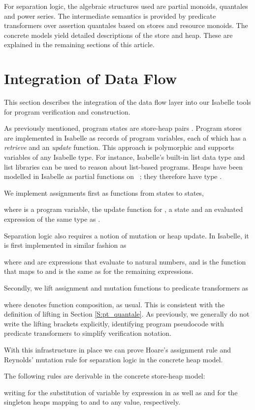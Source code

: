 \documentclass[twoside,runningheads,envcountsame,envcountsect,oribibl,orivec]{llncs}
\begin{document}
For separation logic, the algebraic structures used are partial
monoids, quantales and power series. The intermediate semantics is
provided by predicate transformers over assertion quantales based on
stores and resource monoids. The concrete models yield detailed
descriptions of the store and heap. These are explained in the
remaining sections of this article.






\section{Integration of Data Flow}\label{S:data_flow}

This section describes the integration of the data flow layer into our
Isabelle tools for program verification and construction.

As previously mentioned, program states are store-heap pairs .
Program stores are implemented in Isabelle as records of program
variables, each of which has a \emph{retrieve} and an \emph{update}
function.  This approach is polymorphic and supports variables of any
Isabelle type.  For instance, Isabelle's built-in list data type and
list libraries can be used to reason about list-based programs.  Heaps
have been modelled in Isabelle as partial functions on
~\cite{MehtaN05,Weber04}; they therefore have type
.

We implement assignments first as functions from states to states,

where  is a program variable,  the update function for
,   a state and  an evaluated expression of the same type as .

Separation logic also requires a notion of mutation or heap update.
In Isabelle, it is first implemented in similar fashion as

where  and  are expressions that evaluate to natural numbers,
and  is the function that maps  to  and is the
same as  for the remaining expressions.

Secondly, we lift assignment and mutation functions to
predicate transformers as

where  denotes function composition, as usual. This is
consistent with the definition of lifting in Section
\ref{S:pt_quantale}. As previously, we generally do not write the
lifting brackets explicitly, identifying program pseudocode with
predicate transformers to simplify verification notation.

With this infrastructure in place we can prove Hoare's assignment rule
and Reynolds' mutation rule for separation logic in the concrete heap
model.
\begin{proposition}
  The following rules are derivable in the concrete store-heap model:

writing  for the substitution of variable  by expression
 in  as well as  and  for the
singleton heaps mapping  to  and to any value, respectively.
\end{proposition}
\end{document}
